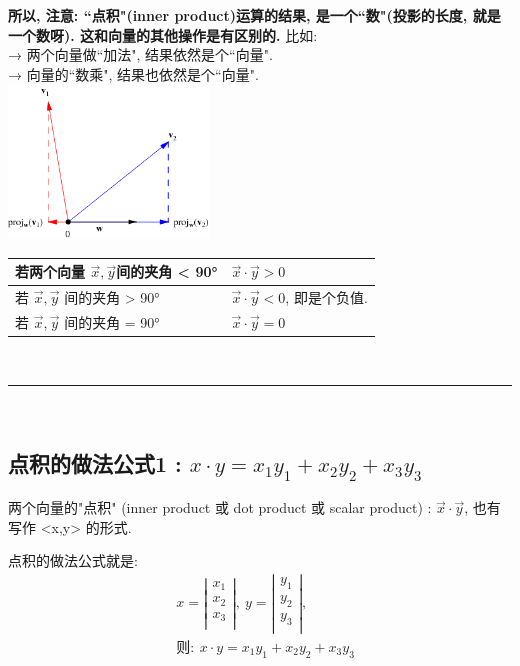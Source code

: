 \documentclass[UTF8]{ctexart}
\begin{document}
\textbf{所以, 注意: ``点积"(inner product)运算的结果, 是一个``数"(投影的长度, 就是一个数呀). 这和向量的其他操作是有区别的.} 比如:  \\
→ 两个向量做``加法", 结果依然是个``向量". \\
→ 向量的``数乘", 结果也依然是个``向量".\\

\includegraphics[width=0.4\textwidth]{img/0094.png} \\


\begin{tabular}{|l|l|}
	\hline
	若两个向量 $\vec{x}, \vec{y} $间的夹角 < 90° & $\vec{x} \cdot \vec{y} > 0$              \\
	\hline
	若 $\vec{x}, \vec{y}$ 间的夹角 > 90°         & $\vec{x} \cdot \vec{y} < 0$, 即是个负值. \\
	\hline
	若 $\vec{x}, \vec{y}$ 间的夹角 = 90°         & $\vec{x} \cdot \vec{y} = 0$              \\
	\hline
\end{tabular}





~\\
\hrule
~\\

\subsection{点积的做法公式1 : $ x\cdot y = x_1 y_{1} + x_2 y_{2} + x_{3}y_{3}$}

两个向量的"点积" (inner product  或 dot product 或 scalar product) : $\vec{x} \cdot \vec{y}$, 也有写作 <x,y> 的形式.

点积的做法公式就是:
\begin{align*}
	 & x=\left| \begin{array}{l}
		            x_1 \\
		            x_2 \\
		            x_3 \\
	            \end{array} \right|,\ y=\left| \begin{array}{l}
		                                           y_1 \\
		                                           y_2 \\
		                                           y_3 \\
	                                           \end{array} \right|, \\
	 & \text{则} :
	\boxed{
	\ x\cdot y = x_1 y_{1} + x_2 y_{2} + x_{3}y_{3}
	}
\end{align*}
\end{document}
